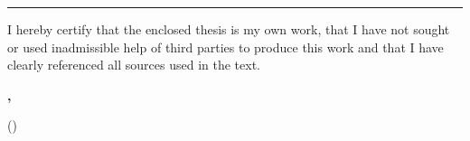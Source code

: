 \vspace*{\fill}

\rule{1.0\textwidth}{0.6pt}

\vspace*{0.75em}

I hereby certify that the enclosed thesis is my own work, that I have not sought or used inadmissible help of third parties to produce this work and that I have clearly referenced all sources used in the text.

\vspace*{0.75em}

\textbf{\myplace, \submissiontime}

\vspace*{4em}

\dotfill \hspace*{8cm} 

\hspace*{1.79cm}(\textbf{\myname})
